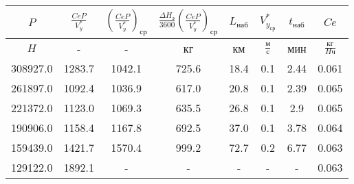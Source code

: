 \begin{tabular}{|c|c|c|c|c|c|c|c|}
\hline
$P$ & $\frac{CeP}{V_y^*}$ & $(\frac{CeP}{V_y^*})_{ср}$ & $\frac{\Delta H_э}{3600}(\frac{CeP}{V_y^*})_{ср}$ & $L_{наб}$ & $V_{y_{ср}}^*$ & $t_{наб}$ & $Ce$ \\ 
\hline
$H$ & - & - & кг & км & $\frac{м}{с}$ & мин & $\frac{кг}{H ч}$ \\ 
\hline
308927.0 & 1283.7 & 1042.1 & 725.6 & 18.4 & 0.1 & 2.44 & 0.061 \\ 
\hline
261897.0 & 1092.4 & 1036.9 & 617.0 & 20.8 & 0.1 & 2.39 & 0.065 \\ 
\hline
221372.0 & 1123.0 & 1069.3 & 635.5 & 26.8 & 0.1 & 2.9 & 0.065 \\ 
\hline
190906.0 & 1158.4 & 1167.8 & 692.5 & 37.0 & 0.1 & 3.78 & 0.064 \\ 
\hline
159439.0 & 1421.7 & 1570.4 & 999.2 & 72.7 & 0.2 & 6.77 & 0.063 \\ 
\hline
129122.0 & 1892.1 & - & - & - & - & - & 0.063 \\ 
\hline
\end{tabular}